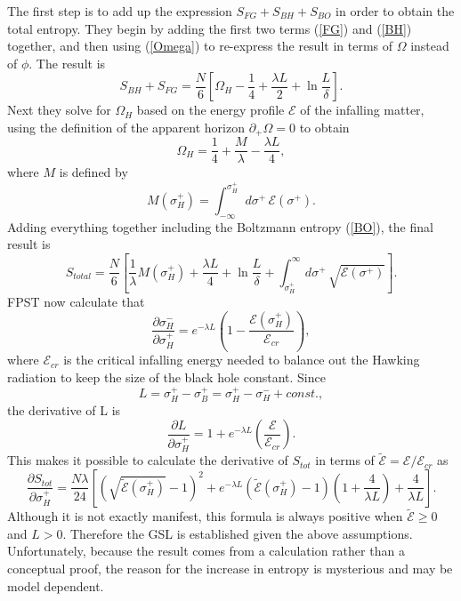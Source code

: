 \documentclass[12pt]{article}
\begin{document}
The first step is to add up the expression $S_{FG} + S_{BH} + S_{BO}$ in order to obtain the total entropy.  They begin by adding the first two terms (\ref{FG}) and (\ref{BH}) together, and then using (\ref{Omega}) to re-express the result in terms of $\Omega$ instead of $\phi$.  The result is
\begin{equation}\label{two}
S_{BH} + S_{FG} = \frac{N}{6} \left[ 
\Omega_H - \frac{1}{4} + \frac{\lambda L}{2} + \ln \frac{L}{\delta}
\right].
\end{equation}
Next they solve for $\Omega_H$ based on the energy profile $\mathcal{E}$ of the infalling matter, using the definition of the apparent horizon $\partial_{+} \Omega = 0$ to obtain
\begin{equation}
\Omega_H = \frac{1}{4} + \frac{M}{\lambda} - \frac{\lambda L}{4},
\end{equation}
where $M$ is defined by
\begin{equation}
M(\sigma^{+}_H) = \int^{\sigma^{+}_H}_{-\infty} d\sigma^{+}\,\mathcal{E}(\sigma^{+}).
\end{equation}
Adding everything together including the Boltzmann entropy (\ref{BO}), the final result is
\begin{equation}
S_{total} = \frac{N}{6} \left[ 
\frac{1}{\lambda} M(\sigma^{+}_H) + \frac{\lambda L}{4} + \ln \frac{L}{\delta}
+ \int^{\infty}_{\sigma^{+}_H} d\sigma^{+}\,\sqrt{\mathcal{E}(\sigma^{+})}
\right].
\end{equation}
FPST now calculate that
\begin{equation}
\frac{\partial \sigma^{-}_H}{\partial \sigma^{+}_H} = 
e^{-\lambda L} \left( 1 - \frac{\mathcal{E}(\sigma^{+}_H)}{\mathcal{E}_{cr}} \right),
\end{equation}
where $\mathcal{E}_{cr}$ is the critical infalling energy needed to balance out the Hawking radiation to keep the size of the black hole constant.  Since
\begin{equation}
L = \sigma^{+}_H - \sigma^{+}_B = \sigma^{+}_H - \sigma^{-}_H + const.,
\end{equation}
the derivative of L is
\begin{equation}
\frac{\partial L}{\partial \sigma^{+}_H} = 
1 + e^{-\lambda L} \left( \frac{\mathcal{E}}{\mathcal{E}_{cr}} \right).
\end{equation}
This makes it possible to calculate the derivative of $S_{tot}$ in terms of 
$\tilde{\mathcal{E}} = \mathcal{E} / \mathcal{E}_{cr}$
as
\begin{equation}
\frac{\partial S_{tot}}{\partial \sigma^{+}_H} =
\frac{N \lambda}{24} \left[
(\sqrt{\tilde{\mathcal{E}}(\sigma^{+}_H)} - 1)^2 + 
e^{-\lambda L} (\tilde{\mathcal{E}}(\sigma^{+}_H) - 1)
\left( 1 + \frac{4}{\lambda L} \right) + \frac{4}{\lambda L} \right].
\end{equation}
Although it is not exactly manifest, this formula is always positive when 
$\tilde{\mathcal{E}} \ge 0$ and $L > 0$.  Therefore the GSL is established given the above assumptions.  Unfortunately, because the result comes from a calculation rather than a conceptual proof, the reason for the increase in entropy is mysterious and may be model dependent.
\end{document}
